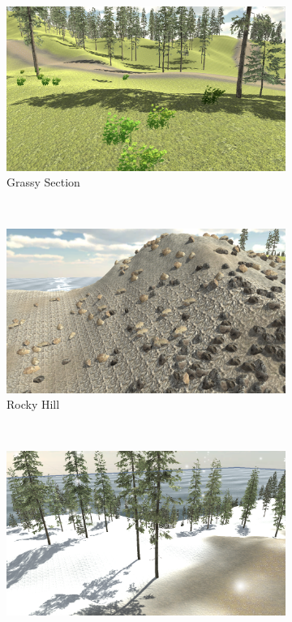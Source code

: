\documentclass{l4proj}
\begin{document}
\begin{figure}[h]
  \centering
  \begin{subfigure}[b]{0.22\textwidth} 
    \includegraphics[width=\textwidth]{dissertation/images/grassy_terrain.png} 
    \caption{Grassy Section}
    \label{fig:terrain_grassy}
  \end{subfigure}
  ~ 
  \begin{subfigure}[b]{0.22\textwidth}
    \includegraphics[width=\textwidth]{dissertation/images/rocky_terrain.png} 
    \caption{Rocky Hill} 
    \label{fig:terrain_rocky}
  \end{subfigure}
  ~  
  \begin{subfigure}[b]{0.22\textwidth}  
    \includegraphics[width=\textwidth]{dissertation/images/snowy_terrain.png}

\end{subfigure}
\end{figure}
\end{document}
